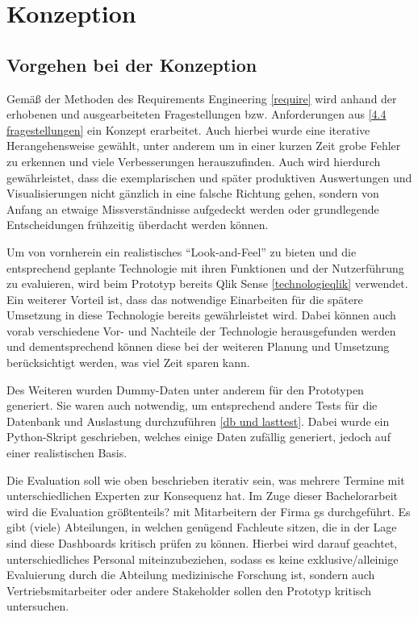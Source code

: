 \chapter{Konzeption}
\label{konzept}

\minitoc\pagebreak

\section{Vorgehen bei der Konzeption}


Gemäß der Methoden des Requirements Engineering \ref{require} wird anhand der erhobenen und ausgearbeiteten Fragestellungen bzw. Anforderungen aus \ref{4.4 fragestellungen} ein Konzept erarbeitet. 
Auch hierbei wurde eine iterative Herangehensweise gewählt, unter anderem um in einer kurzen Zeit grobe Fehler zu erkennen und viele Verbesserungen herauszufinden. 
Auch wird hierdurch gewährleistet, dass die exemplarischen und später produktiven Auswertungen und Visualisierungen nicht gänzlich in eine falsche Richtung gehen, sondern von Anfang an etwaige Missverständnisse aufgedeckt werden oder grundlegende Entscheidungen frühzeitig überdacht werden können.

Um von vornherein ein realistisches "`Look-and-Feel"' zu bieten und die entsprechend geplante Technologie mit ihren Funktionen und der Nutzerführung zu evaluieren, wird beim Prototyp bereits Qlik Sense \ref{technologieqlik} verwendet. 
Ein weiterer Vorteil ist, dass das notwendige Einarbeiten für die spätere Umsetzung in diese Technologie bereits gewährleistet wird. 
Dabei können auch vorab verschiedene Vor- und Nachteile der Technologie herausgefunden werden und dementsprechend können diese bei der weiteren Planung und Umsetzung berücksichtigt werden, was viel Zeit sparen kann.

Des Weiteren wurden Dummy-Daten unter anderem für den Prototypen generiert. 
Sie waren auch notwendig, um entsprechend andere Tests für die Datenbank und Auslastung durchzuführen \ref{db und lasttest}. 
Dabei wurde ein Python-Skript geschrieben, welches einige Daten zufällig generiert, jedoch auf einer realistischen Basis.

Die Evaluation soll wie oben beschrieben iterativ sein, was mehrere Termine mit unterschiedlichen Experten zur Konsequenz hat. 
Im Zuge dieser Bachelorarbeit wird die Evaluation größtenteils? mit Mitarbeitern der Firma gs durchgeführt. 
Es gibt (viele) Abteilungen, in welchen genügend Fachleute sitzen, die in der Lage sind diese Dashboards kritisch prüfen zu können. 
Hierbei wird darauf geachtet, unterschiedliches Personal miteinzubeziehen, sodass es keine exklusive/alleinige Evaluierung durch die Abteilung medizinische Forschung ist, sondern auch Vertriebsmitarbeiter oder andere Stakeholder sollen den Prototyp kritisch untersuchen.


